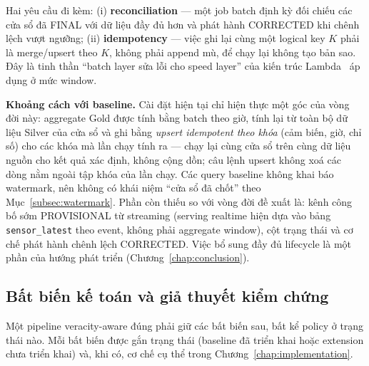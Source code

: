 Hai yêu cầu đi kèm: (i) \textbf{reconciliation} --- một job batch định kỳ đối
chiếu các cửa sổ đã FINAL với dữ liệu đầy đủ hơn và phát hành CORRECTED khi
chênh lệch vượt ngưỡng; (ii) \textbf{idempotency} --- việc ghi lại cùng một
logical key $K$ phải là merge/upsert theo $K$, không phải append mù, để chạy
lại không tạo bản sao. Đây là tinh thần ``batch layer sửa lỗi cho speed
layer'' của kiến trúc Lambda~\cite{lambda_adsb_2023} áp dụng ở mức window.

\textbf{Khoảng cách với baseline.} Cài đặt hiện tại chỉ hiện thực một góc của
vòng đời này: aggregate Gold được tính bằng batch theo giờ, tính lại từ toàn
bộ dữ liệu Silver của cửa sổ và ghi bằng \emph{upsert idempotent theo khóa}
(cảm biến, giờ, chỉ số) cho các khóa mà lần chạy tính ra --- chạy lại cùng
cửa sổ trên cùng dữ liệu nguồn cho kết quả xác định, không cộng dồn;
câu lệnh upsert không xoá các
dòng nằm ngoài tập khóa của lần chạy. Các query baseline không khai báo
watermark, nên không có khái niệm ``cửa sổ đã chốt'' theo
Mục~\ref{subsec:watermark}. Phần còn thiếu so với vòng đời đề xuất là: kênh
công bố sớm PROVISIONAL từ streaming (serving realtime hiện dựa vào bảng
\texttt{sensor\_latest} theo event, không phải aggregate window), cột trạng
thái và cơ chế phát hành chênh lệch CORRECTED. Việc bổ sung đầy đủ lifecycle
là một phần của hướng phát triển (Chương~\ref{chap:conclusion}).

\subsection{Bất biến kế toán và giả thuyết kiểm chứng}
\label{subsec:invariants}
\label{subsec:hypotheses}

Một pipeline veracity-aware đúng phải giữ các bất biến sau, bất kể policy ở
trạng thái nào. Mỗi bất biến được gắn trạng thái (baseline đã triển khai
hoặc extension chưa triển khai) và, khi có, cơ chế cụ thể trong
Chương~\ref{chap:implementation}.

